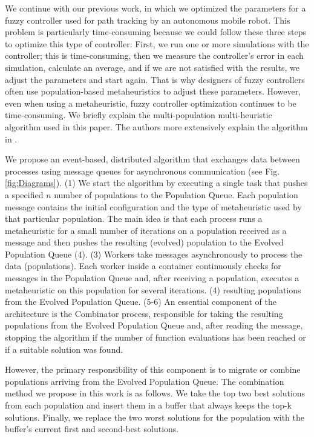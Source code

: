 \documentclass[runningheads]{llncs}
\begin{document}
We continue with our previous work, in which we optimized the parameters for a
fuzzy controller used for path tracking by an autonomous mobile robot. This
problem is particularly time-consuming because we could follow these three
steps to optimize this type of controller: First, we run one or more
simulations with the controller; this is time-consuming, then we measure the
controller's error in each simulation, calculate an average, and if we are not
satisfied with the results, we adjust the parameters and start again. That is
why designers of fuzzy controllers often use population-based metaheuristics to
adjust these parameters. However, even when using a metaheuristic, fuzzy
controller optimization continues to be time-consuming. We briefly explain the
multi-population multi-heuristic algorithm used in this paper. The authors more
extensively explain the algorithm in \cite{mancilla2022optimal}.

We propose an event-based, distributed algorithm that exchanges data between
processes using message queues for asynchronous communication (see Fig.
\ref{fig:Diagrams}). (1) We start the algorithm by executing a single task that
pushes a specified $n$ number of populations to the Population Queue. Each
population message contains the initial configuration and the type of
metaheuristic used by that particular population. The main idea is that each
process runs a metaheuristic for a small number of iterations on a population
received as a message and then pushes the resulting (evolved) population to the
Evolved Population Queue (4). (3) Workers take messages asynchronously to
process the data (populations). Each worker inside a container continuously
checks for messages in the Population Queue and, after receiving a population,
executes a metaheuristic on this population for several iterations. (4)
resulting populations from the Evolved Population Queue. (5-6) An essential
component of the architecture is the Combinator process, responsible for taking
the resulting populations from the Evolved Population Queue and, after reading
the message, stopping the algorithm if the number of function evaluations has
been reached or if a suitable solution was found.

However, the primary responsibility of this component is to migrate or combine
populations arriving from the Evolved Population Queue. The combination method
we propose in this work is as follows. We take the top two best solutions from
each population and insert them in a buffer that always keeps the top-k
solutions. Finally, we replace the two worst solutions for the population with
the buffer's current first and second-best solutions.
\end{document}
